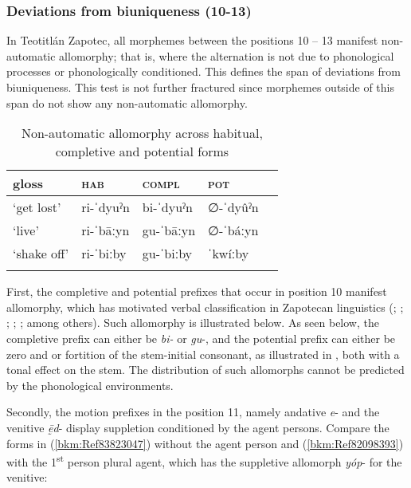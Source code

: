 \documentclass[output=paper]{langscibook}
\begin{document}
\subsubsection{Deviations from biuniqueness (10-13)}

In Teotitlán Zapotec, all morphemes between the positions 10 – 13 manifest non-automatic allomorphy; that is, where the alternation is not due to phonological processes or phonologically conditioned. This defines the span of deviations from biuniqueness. This test is not further fractured since morphemes outside of this span do not show any non-automatic allomorphy. 

\begin{table}
    \begin{tabular}{lllll}
    \lsptoprule
          gloss & \textsc{hab}  & \textsc{compl}   & \textsc{pot}  \\
        \midrule
          `get lost' & ri-ˈdyuˀn & bi-ˈdyuˀn  &  ∅-ˈdyûˀn    \\
          `live' & ri-ˈbāːyn & gu-ˈbāːyn & ∅-ˈbáːyn \\
          `shake off' & ri-ˈbiːby & gu-ˈbiːby  & ˈkwíːby \\
         \lspbottomrule
    \end{tabular}
    \caption{Non-automatic allomorphy across habitual, completive and potential forms}
    \label{tab:habitualcompletivepotential}
\end{table}

First, the completive and potential prefixes that occur in position 10  manifest allomorphy, which has motivated verbal classification in Zapotecan linguistics (\citealt{Kaufman1989}; \citealt{Smith-Stark2002}; \citealt{Campbell2011}; \citealt{Perez-Baez2016}; \citealt{Beam-de-Azcona2019}; among others). Such allomorphy is illustrated below. As seen below, the completive prefix can either be \textit{bi-} or \textit{gu}-, and the potential prefix can either be zero and or fortition of the stem-initial consonant, as illustrated in , both with a tonal effect on the stem. The distribution of such allomorphs cannot be predicted by the phonological environments.


Secondly, the motion prefixes in the position 11, namely andative \textit{e}- and the venitive \textit{ḛ̄d}- display suppletion conditioned by the agent persons. Compare the forms in (\ref{bkm:Ref83823047}) without the agent person and (\ref{bkm:Ref82098393}) with the 1\textsuperscript{st} person plural agent, which has the suppletive allomorph \textit{yóp}- for the venitive: 
\end{document}
